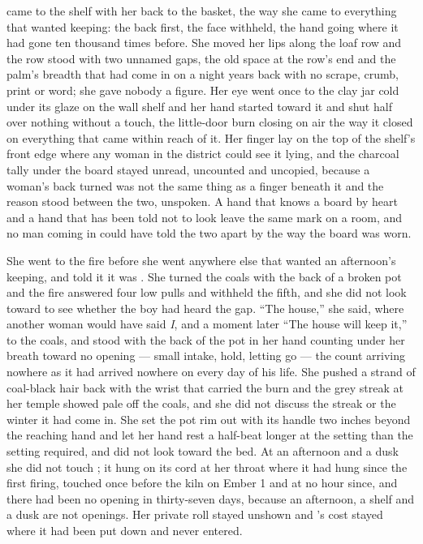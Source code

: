  came to the shelf with her back to the basket, the way she came to everything that wanted keeping: the back first, the face withheld, the hand going where it had gone ten thousand times before. She moved her lips along the loaf row and the row stood with two unnamed gaps, the old space at the row's end and the palm's breadth that had come in on a night years back with no scrape, crumb, print or word; she gave nobody a figure. Her eye went once to the clay jar cold under its glaze on the wall shelf and her hand started toward it and shut half over nothing without a touch, the little-door burn closing on air the way it closed on everything that came within reach of it. Her finger lay on the top of the shelf's front edge where any woman in the district could see it lying, and the charcoal tally under the board stayed unread, uncounted and uncopied, because a woman's back turned was not the same thing as a finger beneath it and the reason stood between the two, unspoken. A hand that knows a board by heart and a hand that has been told not to look leave the same mark on a room, and no man coming in could have told the two apart by the way the board was worn.

She went to the fire before she went anywhere else that wanted an afternoon's keeping, and told it it was . She turned the coals with the back of a broken pot and the fire answered four low pulls and withheld the fifth, and she did not look toward  to see whether the boy had heard the gap. “The house,” she said, where another woman would have said \emph{I}, and a moment later “The house will keep it,” to the coals, and stood with the back of the pot in her hand counting under her breath toward no opening --- small intake, hold, letting go --- the count arriving nowhere as it had arrived nowhere on every day of his life. She pushed a strand of coal-black hair back with the wrist that carried the burn and the grey streak at her temple showed pale off the coals, and she did not discuss the streak or the winter it had come in. She set the pot rim out with its handle two inches beyond the reaching hand and let her hand rest a half-beat longer at the setting than the setting required, and did not look toward the bed. At an afternoon and a dusk she did not touch ; it hung on its cord at her throat where it had hung since the first firing, touched once before the kiln on Ember 1 and at no hour since, and there had been no opening in thirty-seven days, because an afternoon, a shelf and a dusk are not openings. Her private roll stayed unshown and 's cost stayed where it had been put down and never entered.

